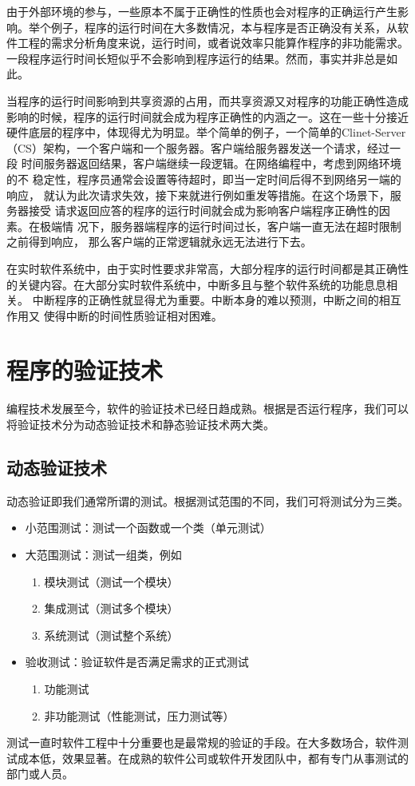 由于外部环境的参与，一些原本不属于正确性的性质也会对程序的正确运行产生影
响。举个例子，程序的运行时间在大多数情况，本与程序是否正确没有关系，从软
件工程的需求分析角度来说，运行时间，或者说效率只能算作程序的非功能需求。
一段程序运行时间长短似乎不会影响到程序运行的结果。然而，事实并非总是如此。

当程序的运行时间影响到共享资源的占用，而共享资源又对程序的功能正确性造成
影响的时候，程序的运行时间就会成为程序正确性的内涵之一。这在一些十分接近
硬件底层的程序中，体现得尤为明显。举个简单的例子，一个简单的Clinet-Server
（CS）架构，一个客户端和一个服务器。客户端给服务器发送一个请求，经过一段
时间服务器返回结果，客户端继续一段逻辑。在网络编程中，考虑到网络环境的不
稳定性，程序员通常会设置等待超时，即当一定时间后得不到网络另一端的响应，
就认为此次请求失效，接下来就进行例如重发等措施。在这个场景下，服务器接受
请求返回应答的程序的运行时间就会成为影响客户端程序正确性的因素。在极端情
况下，服务器端程序的运行时间过长，客户端一直无法在超时限制之前得到响应，
那么客户端的正常逻辑就永远无法进行下去。

在实时软件系统中，由于实时性要求非常高，大部分程序的运行时间都是其正确性
的关键内容。在大部分实时软件系统中，中断多且与整个软件系统的功能息息相关。
中断程序的正确性就显得尤为重要。中断本身的难以预测，中断之间的相互作用又
使得中断的时间性质验证相对困难。

\section{程序的验证技术}
\label{sec:verification}
编程技术发展至今，软件的验证技术已经日趋成熟。根据是否运行程序，我们可以
将验证技术分为动态验证技术和静态验证技术两大类。

\subsection{动态验证技术}
\label{subsec:dynamic}
动态验证即我们通常所谓的测试。根据测试范围的不同，我们可将测试分为三类。
\cite{SWEBOK}
\begin{itemize}
	\item 小范围测试：测试一个函数或一个类（单元测试）
	\item 大范围测试：测试一组类，例如
	\begin{enumerate}[(1)]
		\item 模块测试（测试一个模块）
		\item 集成测试（测试多个模块）
		\item 系统测试（测试整个系统）
	\end{enumerate}
	\item 验收测试：验证软件是否满足需求的正式测试
	\begin{enumerate}[(1)]
		\item 功能测试
		\item 非功能测试（性能测试，压力测试等）
	\end{enumerate}		
\end{itemize}
测试一直时软件工程中十分重要也是最常规的验证的手段。在大多数场合，软件测
试成本低，效果显著。在成熟的软件公司或软件开发团队中，都有专门从事测试的
部门或人员。

